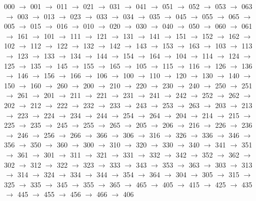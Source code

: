 000 $\rightarrow$ 001 $\rightarrow$ 011 $\rightarrow$ 021 $\rightarrow$ 031 $\rightarrow$ 041 $\rightarrow$ 051 $\rightarrow$ 052 $\rightarrow$ 053 $\rightarrow$ 063 $\rightarrow$ 003 $\rightarrow$ 013 $\rightarrow$ 023 $\rightarrow$ 033 $\rightarrow$ 034 $\rightarrow$ 035 $\rightarrow$ 045 $\rightarrow$ 055 $\rightarrow$ 065 $\rightarrow$ 005 $\rightarrow$ 015 $\rightarrow$ 016 $\rightarrow$ 010 $\rightarrow$ 020 $\rightarrow$ 030 $\rightarrow$ 040 $\rightarrow$ 050 $\rightarrow$ 060 $\rightarrow$ 061 $\rightarrow$ 161 $\rightarrow$ 101 $\rightarrow$ 111 $\rightarrow$ 121 $\rightarrow$ 131 $\rightarrow$ 141 $\rightarrow$ 151 $\rightarrow$ 152 $\rightarrow$ 162 $\rightarrow$ 102 $\rightarrow$ 112 $\rightarrow$ 122 $\rightarrow$ 132 $\rightarrow$ 142 $\rightarrow$ 143 $\rightarrow$ 153 $\rightarrow$ 163 $\rightarrow$ 103 $\rightarrow$ 113 $\rightarrow$ 123 $\rightarrow$ 133 $\rightarrow$ 134 $\rightarrow$ 144 $\rightarrow$ 154 $\rightarrow$ 164 $\rightarrow$ 104 $\rightarrow$ 114 $\rightarrow$ 124 $\rightarrow$ 125 $\rightarrow$ 135 $\rightarrow$ 145 $\rightarrow$ 155 $\rightarrow$ 165 $\rightarrow$ 105 $\rightarrow$ 115 $\rightarrow$ 116 $\rightarrow$ 126 $\rightarrow$ 136 $\rightarrow$ 146 $\rightarrow$ 156 $\rightarrow$ 166 $\rightarrow$ 106 $\rightarrow$ 100 $\rightarrow$ 110 $\rightarrow$ 120 $\rightarrow$ 130 $\rightarrow$ 140 $\rightarrow$ 150 $\rightarrow$ 160 $\rightarrow$ 260 $\rightarrow$ 200 $\rightarrow$ 210 $\rightarrow$ 220 $\rightarrow$ 230 $\rightarrow$ 240 $\rightarrow$ 250 $\rightarrow$ 251 $\rightarrow$ 261 $\rightarrow$ 201 $\rightarrow$ 211 $\rightarrow$ 221 $\rightarrow$ 231 $\rightarrow$ 241 $\rightarrow$ 242 $\rightarrow$ 252 $\rightarrow$ 262 $\rightarrow$ 202 $\rightarrow$ 212 $\rightarrow$ 222 $\rightarrow$ 232 $\rightarrow$ 233 $\rightarrow$ 243 $\rightarrow$ 253 $\rightarrow$ 263 $\rightarrow$ 203 $\rightarrow$ 213 $\rightarrow$ 223 $\rightarrow$ 224 $\rightarrow$ 234 $\rightarrow$ 244 $\rightarrow$ 254 $\rightarrow$ 264 $\rightarrow$ 204 $\rightarrow$ 214 $\rightarrow$ 215 $\rightarrow$ 225 $\rightarrow$ 235 $\rightarrow$ 245 $\rightarrow$ 255 $\rightarrow$ 265 $\rightarrow$ 205 $\rightarrow$ 206 $\rightarrow$ 216 $\rightarrow$ 226 $\rightarrow$ 236 $\rightarrow$ 246 $\rightarrow$ 256 $\rightarrow$ 266 $\rightarrow$ 366 $\rightarrow$ 306 $\rightarrow$ 316 $\rightarrow$ 326 $\rightarrow$ 336 $\rightarrow$ 346 $\rightarrow$ 356 $\rightarrow$ 350 $\rightarrow$ 360 $\rightarrow$ 300 $\rightarrow$ 310 $\rightarrow$ 320 $\rightarrow$ 330 $\rightarrow$ 340 $\rightarrow$ 341 $\rightarrow$ 351 $\rightarrow$ 361 $\rightarrow$ 301 $\rightarrow$ 311 $\rightarrow$ 321 $\rightarrow$ 331 $\rightarrow$ 332 $\rightarrow$ 342 $\rightarrow$ 352 $\rightarrow$ 362 $\rightarrow$ 302 $\rightarrow$ 312 $\rightarrow$ 322 $\rightarrow$ 323 $\rightarrow$ 333 $\rightarrow$ 343 $\rightarrow$ 353 $\rightarrow$ 363 $\rightarrow$ 303 $\rightarrow$ 313 $\rightarrow$ 314 $\rightarrow$ 324 $\rightarrow$ 334 $\rightarrow$ 344 $\rightarrow$ 354 $\rightarrow$ 364 $\rightarrow$ 304 $\rightarrow$ 305 $\rightarrow$ 315 $\rightarrow$ 325 $\rightarrow$ 335 $\rightarrow$ 345 $\rightarrow$ 355 $\rightarrow$ 365 $\rightarrow$ 465 $\rightarrow$ 405 $\rightarrow$ 415 $\rightarrow$ 425 $\rightarrow$ 435 $\rightarrow$ 445 $\rightarrow$ 455 $\rightarrow$ 456 $\rightarrow$ 466 $\rightarrow$ 406 